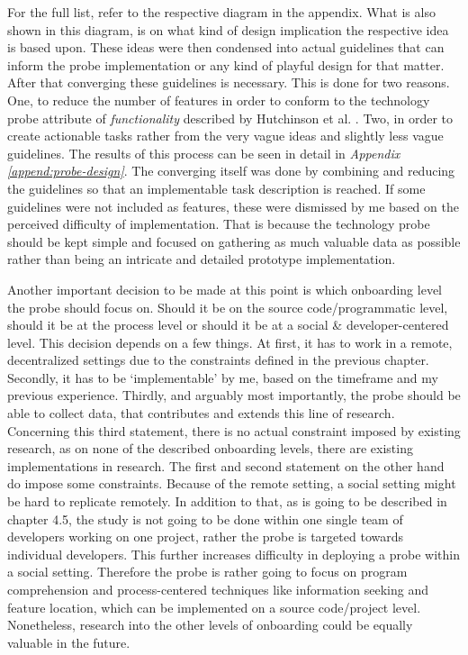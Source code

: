 For the full list, refer to the respective diagram in the appendix. What is also shown in this diagram, is on what kind of design implication the respective idea is based upon. These ideas were then condensed into actual guidelines that can inform the probe implementation or any kind of playful design for that matter. After that converging these guidelines is necessary. This is done for two reasons. One, to reduce the number of features in order to conform to the technology probe attribute of \textit{functionality} described by Hutchinson et al. \cite[p. 18]{hutchinson2003technology}. Two, in order to create actionable tasks rather from the very vague ideas and slightly less vague guidelines. The results of this process can be seen in detail in \textit{Appendix \ref{append:probe-design}}. The converging itself was done by combining and reducing the guidelines so that an implementable task description is reached. If some guidelines were not included as features, these were dismissed by me based on the perceived difficulty of implementation. That is because the technology probe should be kept simple and focused on gathering as much valuable data as possible rather than being an intricate and detailed prototype implementation.

Another important decision to be made at this point is which onboarding level the probe should focus on. Should it be on the source code/programmatic level, should it be at the process level or should it be at a social \& developer-centered level. This decision depends on a few things. At first, it has to work in a remote, decentralized settings due to the constraints defined in the previous chapter. Secondly, it has to be \enquote*{implementable} by me, based on the timeframe and my previous experience. Thirdly, and arguably most importantly, the probe should be able to collect data, that contributes and extends this line of research. Concerning this third statement, there is no actual constraint imposed by existing research, as on none of the described onboarding levels, there are existing implementations in research. The first and second statement on the other hand do impose some constraints. Because of the remote setting, a social setting might be hard to replicate remotely. In addition to that, as is going to be described in chapter 4.5, the study is not going to be done within one single team of developers working on one project, rather the probe is targeted towards individual developers. This further increases difficulty in deploying a probe within a social setting. Therefore the probe is rather going to focus on program comprehension and process-centered techniques like information seeking and feature location, which can be implemented on a source code/project level. Nonetheless, research into the other levels of onboarding could be equally valuable in the future.

